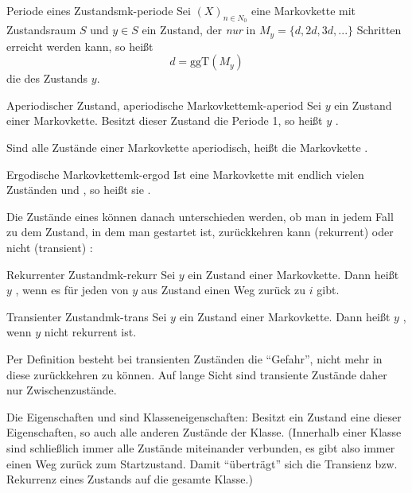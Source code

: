 \begin{definition}{Periode eines Zustands}{mk-periode}
Sei $(X)_{n\in N_0}$ eine Markovkette mit Zustandsraum $S$ und $y\in S$ ein
Zustand, der \emph{nur} in $M_y=\{d, 2d, 3d, ...\}$ Schritten erreicht werden
kann, so heißt
\[
d = \mathrm{ggT}(M_y)
\]
die  des Zustands $y$.
\end{definition}

\begin{definition}{Aperiodischer Zustand, aperiodische Markovkette}{mk-aperiod}
Sei $y$ ein Zustand einer Markovkette. Besitzt dieser Zustand die Periode 1, so
heißt $y$ .

Sind alle Zustände einer Markovkette aperiodisch, heißt die Markovkette
.
\end{definition}

\begin{definition}{Ergodische Markovkette}{mk-ergod}
Ist eine Markovkette mit endlich vielen Zuständen  und
, so heißt sie .
\end{definition}

Die Zustände eines  können danach
unterschieden werden, ob man in jedem Fall zu dem Zustand, in dem man gestartet
ist, zurückkehren kann (rekurrent) oder nicht (transient)
:

\begin{definition}{Rekurrenter Zustand}{mk-rekurr}
Sei $y$ ein Zustand einer Markovkette. Dann heißt $y$ , wenn
es für jeden von $y$ aus  Zustand einen
Weg zurück zu $i$ gibt.
\end{definition}

\begin{definition}{Transienter Zustand}{mk-trans}
Sei $y$ ein Zustand einer Markovkette. Dann heißt $y$ , wenn $y$
nicht rekurrent ist.
\end{definition}

Per Definition besteht bei transienten Zuständen die "`Gefahr"', nicht mehr in
diese zurückkehren zu können. Auf lange Sicht sind transiente Zustände daher nur
Zwischenzustände.

Die Eigenschaften  und
 sind Klasseneigenschaften: Besitzt ein Zustand
eine dieser Eigenschaften, so auch alle anderen Zustände der Klasse. (Innerhalb
einer Klasse sind schließlich immer alle Zustände miteinander verbunden, es gibt
also immer einen Weg zurück zum Startzustand. Damit "`überträgt"' sich die
Transienz bzw. Rekurrenz eines Zustands auf die gesamte Klasse.)

